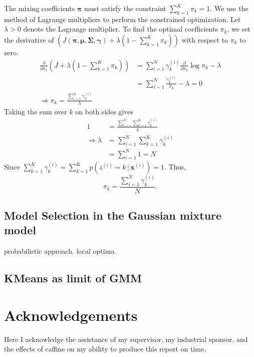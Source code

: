 \documentclass[final,3p,times,twocolumn]{elsarticle}
\begin{document}
The mixing coefficients $\boldsymbol \pi$ must satisfy the constraint $\sum_{k=1}^K \pi_k = 1$.
We use the method of Lagrange multipliers to perform the constrained optimization.
Let $\lambda > 0$ denote the Lagrange multiplier.
To find the optimal coefficients $\pi_k$, we set the derivative of $(J(\boldsymbol \pi, \boldsymbol \mu, \boldsymbol \Sigma, \boldsymbol \gamma) + \lambda(1-\sum_{k=1}^K \pi_k))$ with respect to $\pi_k$ to zero.
\begin{equation}
\label{eqn:gmmPi1}
\begin{split}
\frac{\partial}{\partial \pi_k}(J + \lambda(1 - \sum_{k=1}^K \pi_k)) &= \sum_{i=1}^N\gamma_k^{(i)} \frac{\partial}{\partial \pi_k} \log \pi_k - \lambda\\
&= \sum_{i=1}^N \frac{\gamma_k^{(i)}}{\pi_k} - \lambda = 0\\
\Rightarrow \pi_k = \frac{\sum_{i=1}^N\gamma_k^{(i)}}{\lambda}
\end{split}
\end{equation}
Taking the sum over $k$ on both sides gives
\begin{equation}
\label{eqn:gmmPi2}
\begin{split}
1 &= \frac{\sum_{i=1}^N \sum_{k=1}^K \gamma_k^{(i)}}{\lambda}\\
\Rightarrow \lambda &= \sum_{i=1}^N \sum_{k=1}^K \gamma_k^{(i)}\\
&= \sum_{i=1}^N 1 = N
\end{split}
\end{equation}
Since $\sum_{k=1}^K \gamma_k^{(i)} = \sum_{k=1}^K p(z^{(i)} = k\,|\,\boldsymbol x^{(i)}) = 1$.
Thus,
\begin{equation}
\pi_k = \frac{\sum_{i=1}^N \gamma_k^{(i)}}{N}.
\label{eqn:gmmPi3}
\end{equation}

\subsection{Model Selection in the Gaussian mixture model}
probabilistic approach.
local optima.

\subsection{KMeans as limit of GMM}


\section*{Acknowledgements}
Here I acknowledge the assistance of my supervisor, my industrial sponsor,
and the effects of caffine on my ability to produce this report on time.
\end{document}
